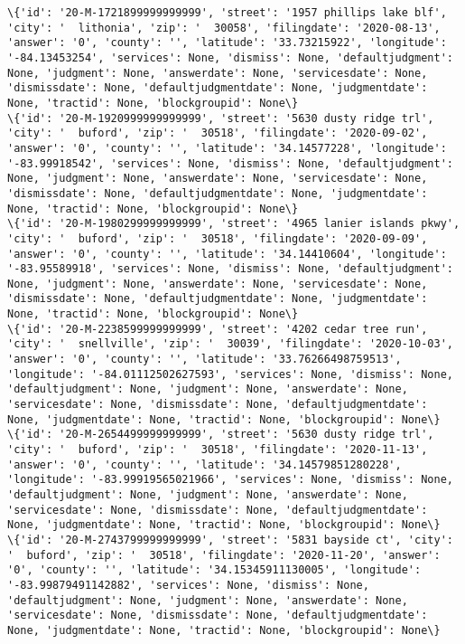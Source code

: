 \documentclass[11pt]{article}
\begin{document}
\begin{Verbatim}[commandchars=\\\{\}]
\{'id': '20-M-1721899999999999', 'street': '1957 phillips lake blf', 'city': '  lithonia', 'zip': '  30058', 'filingdate': '2020-08-13', 'answer': '0', 'county': '', 'latitude': '33.73215922', 'longitude': '-84.13453254', 'services': None, 'dismiss': None, 'defaultjudgment': None, 'judgment': None, 'answerdate': None, 'servicesdate': None, 'dismissdate': None, 'defaultjudgmentdate': None, 'judgmentdate': None, 'tractid': None, 'blockgroupid': None\}
\{'id': '20-M-1920999999999999', 'street': '5630 dusty ridge trl', 'city': '  buford', 'zip': '  30518', 'filingdate': '2020-09-02', 'answer': '0', 'county': '', 'latitude': '34.14577228', 'longitude': '-83.99918542', 'services': None, 'dismiss': None, 'defaultjudgment': None, 'judgment': None, 'answerdate': None, 'servicesdate': None, 'dismissdate': None, 'defaultjudgmentdate': None, 'judgmentdate': None, 'tractid': None, 'blockgroupid': None\}
\{'id': '20-M-1980299999999999', 'street': '4965 lanier islands pkwy', 'city': '  buford', 'zip': '  30518', 'filingdate': '2020-09-09', 'answer': '0', 'county': '', 'latitude': '34.14410604', 'longitude': '-83.95589918', 'services': None, 'dismiss': None, 'defaultjudgment': None, 'judgment': None, 'answerdate': None, 'servicesdate': None, 'dismissdate': None, 'defaultjudgmentdate': None, 'judgmentdate': None, 'tractid': None, 'blockgroupid': None\}
\{'id': '20-M-2238599999999999', 'street': '4202 cedar tree run', 'city': '  snellville', 'zip': '  30039', 'filingdate': '2020-10-03', 'answer': '0', 'county': '', 'latitude': '33.76266498759513', 'longitude': '-84.01112502627593', 'services': None, 'dismiss': None, 'defaultjudgment': None, 'judgment': None, 'answerdate': None, 'servicesdate': None, 'dismissdate': None, 'defaultjudgmentdate': None, 'judgmentdate': None, 'tractid': None, 'blockgroupid': None\}
\{'id': '20-M-2654499999999999', 'street': '5630 dusty ridge trl', 'city': '  buford', 'zip': '  30518', 'filingdate': '2020-11-13', 'answer': '0', 'county': '', 'latitude': '34.14579851280228', 'longitude': '-83.99919565021966', 'services': None, 'dismiss': None, 'defaultjudgment': None, 'judgment': None, 'answerdate': None, 'servicesdate': None, 'dismissdate': None, 'defaultjudgmentdate': None, 'judgmentdate': None, 'tractid': None, 'blockgroupid': None\}
\{'id': '20-M-2743799999999999', 'street': '5831 bayside ct', 'city': '  buford', 'zip': '  30518', 'filingdate': '2020-11-20', 'answer': '0', 'county': '', 'latitude': '34.15345911130005', 'longitude': '-83.99879491142882', 'services': None, 'dismiss': None, 'defaultjudgment': None, 'judgment': None, 'answerdate': None, 'servicesdate': None, 'dismissdate': None, 'defaultjudgmentdate': None, 'judgmentdate': None, 'tractid': None, 'blockgroupid': None\}

\end{Verbatim}
\end{document}

